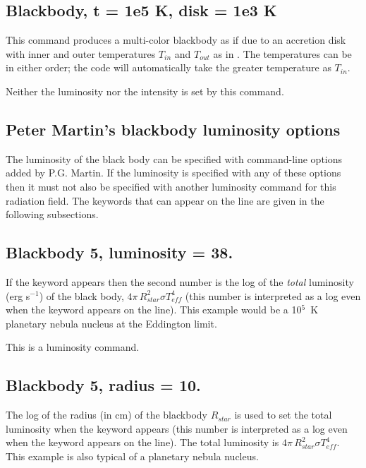 \subsection{Blackbody, t = 1e5 K, disk = 1e3 K}

This command produces a multi-color blackbody as if due to an accretion disk  with
inner and outer temperatures $T_{in}$ and $T_{out}$ as in \citet{Mitsuda1984}.  
The temperatures can be in either order; the code will automatically take the 
greater temperature as $T_{in}$.  

Neither the luminosity nor the intensity is set by this command.

\subsection{Peter Martin's blackbody luminosity options}

The luminosity of the black body can be specified with command-line
options added by P.G. Martin.
If the luminosity is specified
with any of these options then it must not also be specified with another
luminosity command for this radiation field.
The keywords that can appear
on the line are given in the following subsections.

\subsection{Blackbody 5, luminosity = 38.   }

If the keyword  appears then the second number
is the log of
the \emph{total} luminosity (erg s$^{-1}$) of the black body, $4\pi \,R_{star}^2 \sigma T_{eff}^4 $
(this number is interpreted as a log even when the keyword  appears on the line).
This example would be a 10$^5$~K planetary nebula nucleus at the Eddington
limit.

This is a luminosity command.

\subsection{Blackbody 5, radius = 10.  }

The log of the radius (in cm) of the blackbody $R_{star}$
is used to set the
total luminosity when the keyword  appears
(this number is interpreted as a log even when the keyword  appears on the line).
The total luminosity
is $4\pi \,R_{star}^2 \sigma T_{eff}^4 $.
This example is also typical of a planetary nebula nucleus.

